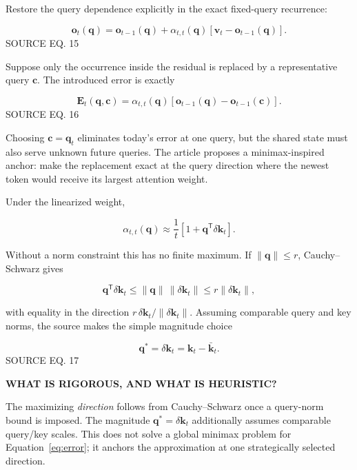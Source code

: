 \documentclass[11pt]{article}
\newcommand{\vect}[1]{\bm{#1}}
\newcommand{\trans}{^{\mathsf T}}
\newcommand{\sourceeq}[1]{\hfill{\sffamily\scriptsize\color{Muted}SOURCE EQ. #1}}
\newenvironment{orangebox}[1]{%
  \def\FrameCommand{\fcolorbox{Orange}{OrangeTint}}%
  \MakeFramed{\advance\hsize-\width\FrameRestore}%
  {\sffamily\bfseries\color{Orange}#1}\par\smallskip
}{\endMakeFramed}
\begin{document}
Restore the query dependence explicitly in the exact fixed-query recurrence:

\begin{equation}
  \vect o_t(\vect q)=\vect o_{t-1}(\vect q)
  +\alpha_{t,t}(\vect q)
   [\vect v_t-\vect o_{t-1}(\vect q)].
  \tag{15}\label{eq:qexplicit}
\end{equation}
\sourceeq{15}

Suppose only the occurrence inside the residual is replaced by a representative
query $\vect c$. The introduced error is exactly

\begin{equation}
  \vect E_t(\vect q,\vect c)
  =\alpha_{t,t}(\vect q)
   [\vect o_{t-1}(\vect q)-\vect o_{t-1}(\vect c)].
  \tag{16}\label{eq:error}
\end{equation}
\sourceeq{16}

Choosing $\vect c=\vect q_t$ eliminates today's error at one query, but the
shared state must also serve unknown future queries. The article proposes a
minimax-inspired anchor: make the replacement exact at the query direction
where the newest token would receive its largest attention weight.

Under the linearized weight,

\[
  \alpha_{t,t}(\vect q)
  \approx \frac1t[1+\vect q\trans\delta\vect k_t].
\]

Without a norm constraint this has no finite maximum. If
$\lVert\vect q\rVert\le r$, Cauchy--Schwarz gives

\[
  \vect q\trans\delta\vect k_t
  \le \lVert\vect q\rVert\,\lVert\delta\vect k_t\rVert
  \le r\lVert\delta\vect k_t\rVert,
\]

with equality in the direction
$r\,\delta\vect k_t/\lVert\delta\vect k_t\rVert$. Assuming comparable query
and key norms, the source makes the simple magnitude choice

\begin{equation}
  \vect q^*=\delta\vect k_t=\vect k_t-\bar{\vect k}_t.
  \tag{17}\label{eq:qstar}
\end{equation}
\sourceeq{17}

\begin{orangebox}{WHAT IS RIGOROUS, AND WHAT IS HEURISTIC?}
  The maximizing \emph{direction} follows from Cauchy--Schwarz once a query-norm
  bound is imposed. The magnitude $\vect q^*=\delta\vect k_t$ additionally
  assumes comparable query/key scales. This does not solve a global minimax
  problem for Equation~\eqref{eq:error}; it anchors the approximation at one
  strategically selected direction.
\end{orangebox}
\end{document}
